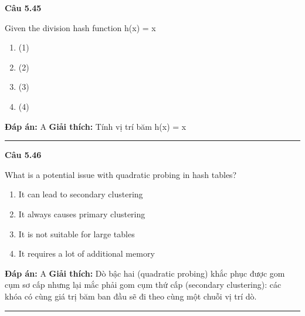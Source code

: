 \documentclass[11pt,a4paper]{article}
\newenvironment{question}[1]{%
  \par\vspace{1em}\noindent\textbf{\large Câu #1}\par\vspace{0.4em}
}{%
  \par\vspace{1em}\hrule\vspace{0.6em}
}
\newenvironment{choices}{%
  \begin{enumerate}[label=\textbf{\Alph*.},leftmargin=2.2em,itemsep=2pt,topsep=3pt]
}{%
  \end{enumerate}
}
\newcommand{\choice}{\item}
\begin{document}
\begin{question}{5.45}
Given the division hash function h(x) = x %
\begin{choices}
\choice (1)
\choice (2)
\choice (3)
\choice (4)
\end{choices}
\textbf{Đáp án:} A
\textbf{Giải thích:} Tính vị trí băm h(x) = x %
\end{question}

\begin{question}{5.46}
What is a potential issue with quadratic probing in hash tables?
\begin{choices}
\choice It can lead to secondary clustering
\choice It always causes primary clustering
\choice It is not suitable for large tables
\choice It requires a lot of additional memory
\end{choices}
\textbf{Đáp án:} A
\textbf{Giải thích:} Dò bậc hai (quadratic probing) khắc phục được gom cụm sơ cấp nhưng lại mắc phải gom cụm thứ cấp (secondary clustering): các khóa có cùng giá trị băm ban đầu sẽ đi theo cùng một chuỗi vị trí dò.
\end{question}
\end{document}
